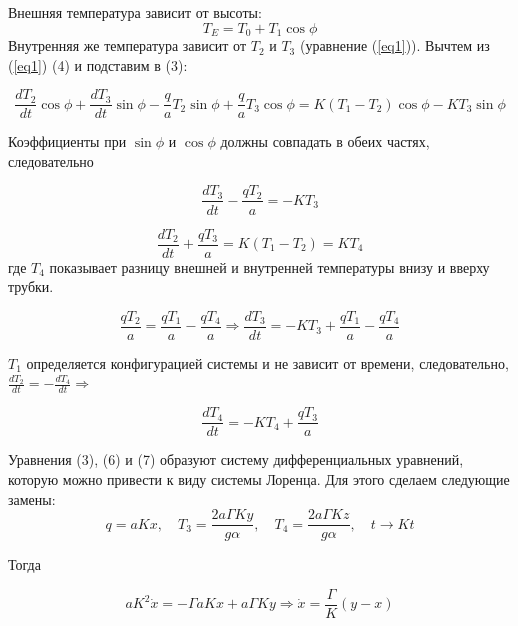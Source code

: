 \documentclass[12pt]{article}
\begin{document}
Внешняя температура зависит от высоты: 
\begin{equation}\label{eq4}
T_E = T_0+T_1\cos\phi
\end{equation}
Внутренняя же температура зависит от $T_2$ и $T_3$ (уравнение (\ref{eq1})). Вычтем из (\ref{eq1}) (4) и подставим в (3):

\begin{equation*}
\frac{dT_2}{dt}\cos\phi + \frac{dT_3}{dt}\sin\phi - \frac{q}{a}T_2\sin\phi + \frac{q}{a}T_3\cos\phi = K(T_1-T_2)\cos\phi-KT_3\sin\phi
\end{equation*}

Коэффициенты при $\sin\phi$ и $\cos\phi$ должны совпадать в обеих частях, следовательно 

\begin{equation*}
\frac{dT_3}{dt} - \frac{qT_2}{a} = -KT_3
\end{equation*}

\begin{equation*}
\frac{dT_2}{dt} + \frac{qT_3}{a} = K(T_1-T_2) = KT_4
\end{equation*}
где $T_4$ показывает разницу внешней и внутренней температуры внизу и вверху трубки.

\begin{equation}\label{eq5}
\frac{qT_2}{a} = \frac{qT_1}{a} - \frac{qT_4}{a} \Longrightarrow \frac{dT_3}{dt} = -KT_3 + \frac{qT_1}{a} - \frac{qT_4}{a}
\end{equation}

$T_1$ определяется конфигурацией системы и не зависит от времени, следовательно, $\frac{dT_2}{dt} = -\frac{dT_4}{dt} \Longrightarrow$

\begin{equation}\label{eq6}
\frac{dT_4}{dt} = -KT_4 + \frac{qT_3}{a}
\end{equation}

Уравнения (3), (6) и (7) образуют систему дифференциальных уравнений, которую можно привести к виду системы Лоренца. Для этого сделаем следующие замены:
\begin{equation*}
q = aKx, \quad T_3 = \frac{2a \Gamma Ky}{g \alpha}, \quad T_4 = \frac{2a \Gamma Kz}{g \alpha}, \quad t \rightarrow Kt
\end{equation*}

Тогда

\begin{equation*}
aK^2\dot{x} = -\Gamma aKx + a\Gamma Ky \Longrightarrow \dot{x} = \frac{\Gamma}{K} (y - x)
\end{equation*}
\end{document}
